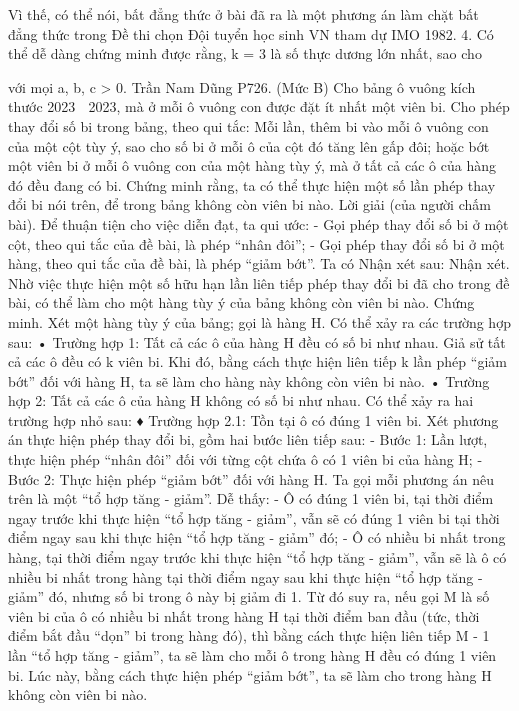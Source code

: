 \begin{multicols}{2}
{	Vì thế, có thể nói, bất đẳng thức ở bài đã ra là một phương án làm chặt bất đẳng thức trong Đề thi chọn Đội tuyển học sinh VN tham dự IMO 1982.
	4. Có thể dễ dàng chứng minh được rằng, k = 3 là số thực dương lớn nhất, sao cho
	
	với mọi a, b, c > 0.
	Trần Nam Dũng
	P726. (Mức B) Cho bảng ô vuông kích thước 2023  2023, mà ở mỗi ô vuông con được đặt ít nhất một viên bi. Cho phép thay đổi số bi trong bảng, theo qui tắc: Mỗi lần, thêm bi vào mỗi ô vuông con của một cột tùy ý, sao cho số bi ở mỗi ô của cột đó tăng lên gấp đôi; hoặc bớt một viên bi ở mỗi ô vuông con của một hàng tùy ý, mà ở tất cả các ô của hàng đó đều đang có bi. Chứng minh rằng, ta có thể thực hiện một số lần phép thay đổi bi nói trên, để trong bảng không còn viên bi nào.
	Lời giải (của người chấm bài).
	Để thuận tiện cho việc diễn đạt, ta qui ước:
	- Gọi phép thay đổi số bi ở một cột, theo qui tắc của đề bài, là phép “nhân đôi”;
	- Gọi phép thay đổi số bi ở một hàng, theo qui tắc của đề bài, là phép “giảm bớt”.
	Ta có Nhận xét sau:
	Nhận xét. Nhờ việc thực hiện một số hữu hạn lần liên tiếp phép thay đổi bi đã cho trong đề bài, có thể làm cho một hàng tùy ý của bảng không còn viên bi nào.
	Chứng minh.
	Xét một hàng tùy ý của bảng; gọi là hàng H. Có thể xảy ra các trường hợp sau:
	• Trường hợp 1: Tất cả các ô của hàng H đều có số bi như nhau.
	Giả sử tất cả các ô đều có k viên bi.
	Khi đó, bằng cách thực hiện liên tiếp k lần phép “giảm bớt” đối với hàng H, ta sẽ làm cho hàng này không còn viên bi nào.
	• Trường hợp 2: Tất cả các ô của hàng H không có số bi như nhau.
	Có thể xảy ra hai trường hợp nhỏ sau:
	♦ Trường hợp 2.1: Tồn tại ô có đúng 1 viên bi.
	Xét phương án thực hiện phép thay đổi bi, gồm hai bước liên tiếp sau:
	- Bước 1: Lần lượt, thực hiện phép “nhân đôi” đối với từng cột chứa ô có 1 viên bi của hàng H;
	- Bước 2: Thực hiện phép “giảm bớt” đối với hàng H.
	Ta gọi mỗi phương án nêu trên là một “tổ hợp tăng - giảm”.
	Dễ thấy:
	- Ô có đúng 1 viên bi, tại thời điểm ngay trước khi thực hiện “tổ hợp tăng - giảm”, vẫn sẽ có đúng 1 viên bi tại thời điểm ngay sau khi thực hiện “tổ hợp tăng - giảm” đó;
	- Ô có nhiều bi nhất trong hàng, tại thời điểm ngay trước khi thực hiện “tổ hợp tăng - giảm”, vẫn sẽ là ô có nhiều bi nhất trong hàng tại thời điểm ngay sau khi thực hiện “tổ hợp tăng - giảm” đó, nhưng số bi trong ô này bị giảm đi 1.
	Từ đó suy ra, nếu gọi M là số viên bi của ô có nhiều bi nhất trong hàng H tại thời điểm ban đầu (tức, thời điểm bắt đầu “dọn” bi trong hàng đó), thì bằng cách thực hiện liên tiếp M - 1 lần “tổ hợp tăng - giảm”, ta sẽ làm cho mỗi ô trong hàng H đều có đúng 1 viên bi. Lúc này, bằng cách thực hiện phép “giảm bớt”, ta sẽ làm cho trong hàng H không còn viên bi nào.
}
\end{multicols}
